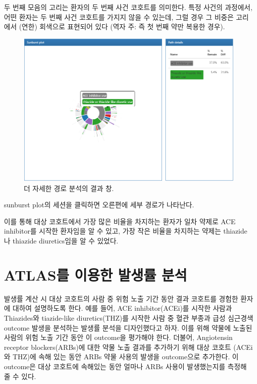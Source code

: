 \documentclass[10.5pt]{book}
\theoremstyle{definition}
\theoremstyle{definition}
\theoremstyle{definition}
\theoremstyle{remark}
\begin{document}
두 번째 모음의 고리는 환자의 두 번째 사건 코호트를 의미한다. 특정 사건의
과정에서, 어떤 환자는 두 번째 사건 코호트를 가지지 않을 수 있는데, 그럴
경우 그 비중은 고리에서 (연한) 회색으로 표현되어 있다 (역자 주: 즉 첫
번째 약만 복용한 경우).

\begin{figure}

{\centering \includegraphics[width=1\linewidth]{images/Characterization/atlasPathwaysResultsPathDetails} 

}

\caption{더 자세한 경로 분석의 결과 창.}\label{fig:atlasPathwaysResultsPathDetails}
\end{figure}

sunburst plot의 세션을 클릭하면 오른편에 세부 경로가 나타난다.

이를 통해 대상 코호트에서 가장 많은 비율을 차지하는 환자가 일차 약제로
ACE inhibitor를 시작한 환자임을 알 수 있고, 가장 작은 비율을 차지하는
약제는 thiazide나 thiazide diuretics임을 알 수 있었다.

\section{ATLAS를 이용한 발생률 분석}\label{atlas---}

발생률 계산 시 대상 코호트의 사람 중 위험 노출 기간 동안 결과 코호트를
경험한 환자에 대하여 설명하도록 한다. 예를 들어, ACE inhibitor(ACEi)를
시작한 사람과 Thiazides와 tiazide-like diuretics(THZ)를 시작한 사람 중
혈관 부종과 급성 심근경색 outcome 발생을 분석하는 발생률 분석을
디자인했다고 하자. 이를 위해 약물에 노출된 사람의 위험 노출 기간 동안 이
outcome을 평가해야 한다. 더불어, Angiotensin receptor blockers(ARBs)에
대한 약물 노출 결과를 추가하기 위해 대상 코호트 (ACEi와 THZ)에 속해 있는
동안 ARBs 약물 사용의 발생을 outcome으로 추가한다. 이 outcome은 대상
코호트에 속해있는 동안 얼마나 ARBs 사용이 발생했는지를 측정해 줄 수
있다.
\end{document}
